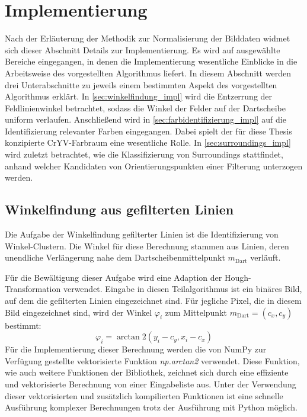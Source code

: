 
\section{Implementierung}
\label{sec:cv:implementierung}

Nach der Erläuterung der Methodik zur Normalisierung der Bilddaten widmet sich dieser Abschnitt Details zur Implementierung. Es wird auf ausgewählte Bereiche eingegangen, in denen die Implementierung wesentliche Einblicke in die Arbeitsweise des vorgestellten Algorithmus liefert. In diesem Abschnitt werden drei Unterabschnitte zu jeweils einem bestimmten Aspekt des vorgestellten Algorithmus erklärt. In \autoref{sec:winkelfindung_impl} wird die Entzerrung der Feldlinienwinkel betrachtet, sodass die Winkel der Felder auf der Dartscheibe uniform verlaufen. Anschließend wird in \autoref{sec:farbidentifizierung_impl} auf die Identifizierung relevanter Farben eingegangen. Dabei spielt der für diese Thesis konzipierte CrYV-Farbraum eine wesentliche Rolle. In \autoref{sec:surroundings_impl} wird zuletzt betrachtet, wie die Klassifizierung von Surroundings stattfindet, anhand welcher Kandidaten von Orientierungspunkten einer Filterung unterzogen werden.


\subsection{Winkelfindung aus gefilterten Linien}
\label{sec:winkelfindung_impl}

Die Aufgabe der Winkelfindung gefilterter Linien ist die Identifizierung von Winkel-Clustern. Die Winkel für diese Berechnung stammen aus Linien, deren unendliche Verlängerung nahe dem Dartscheibenmittelpunkt $m_\text{Dart}$ verläuft.

Für die Bewältigung dieser Aufgabe wird eine Adaption der Hough-Transformation verwendet. Eingabe in diesen Teilalgorithmus ist ein binäres Bild, auf dem die gefilterten Linien eingezeichnet sind. Für jegliche Pixel, die in diesem Bild eingezeichnet sind, wird der Winkel $\varphi_i$ zum Mittelpunkt $m_\text{Dart} = (c_x, c_y)$ bestimmt:
\[\varphi_i = \arctan2\left( y_i - c_y, x_i - c_x \right)\]
\vspace*{-0.1cm}
Für die Implementierung dieser Berechnung werden die von NumPy zur Verfügung gestellte vektorisierte Funktion \textit{np.arctan2} verwendet. Diese Funktion, wie auch weitere Funktionen der Bibliothek, zeichnet sich durch eine effiziente und vektorisierte Berechnung von einer Eingabeliste aus. Unter der Verwendung dieser vektorisierten und zusätzlich kompilierten Funktionen ist eine schnelle Ausführung komplexer Berechnungen trotz der Ausführung mit Python möglich.

